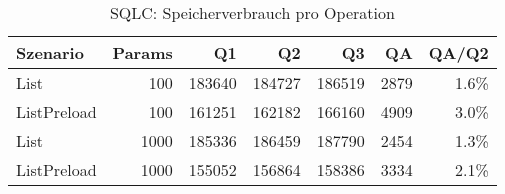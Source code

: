 \begin{table}[ht]
\centering
\caption{SQLC: Speicherverbrauch pro Operation}
\begin{tabular}{lrrrrrr}
\toprule
Szenario & Params & Q1 & Q2 & Q3 & QA & QA/Q2 \\
\midrule
		List & 100 & 183640 & 184727 & 186519 & 2879 & 1.6\% \\
		ListPreload & 100 & 161251 & 162182 & 166160 & 4909 & 3.0\% \\
		List & 1000 & 185336 & 186459 & 187790 & 2454 & 1.3\% \\
		ListPreload & 1000 & 155052 & 156864 & 158386 & 3334 & 2.1\% \\
\bottomrule
\end{tabular}
\label{tab:benchmark_sqlc_bytesperop}
\end{table}
	